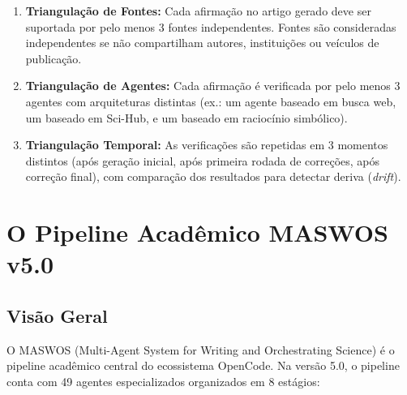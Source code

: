 \begin{enumerate}
  \item \textbf{Triangulação de Fontes:} Cada afirmação no artigo gerado deve ser suportada por pelo menos 3 fontes independentes. Fontes são consideradas independentes se não compartilham autores, instituições ou veículos de publicação.
  \item \textbf{Triangulação de Agentes:} Cada afirmação é verificada por pelo menos 3 agentes com arquiteturas distintas (ex.: um agente baseado em busca web, um baseado em Sci-Hub, e um baseado em raciocínio simbólico).
  \item \textbf{Triangulação Temporal:} As verificações são repetidas em 3 momentos distintos (após geração inicial, após primeira rodada de correções, após correção final), com comparação dos resultados para detectar deriva (\textit{drift}).
\end{enumerate}

\section{O Pipeline Acadêmico MASWOS v5.0}

\subsection{Visão Geral}

O MASWOS (Multi-Agent System for Writing and Orchestrating Science) é o pipeline acadêmico central do ecossistema OpenCode. Na versão 5.0, o pipeline conta com 49 agentes especializados organizados em 8 estágios:

